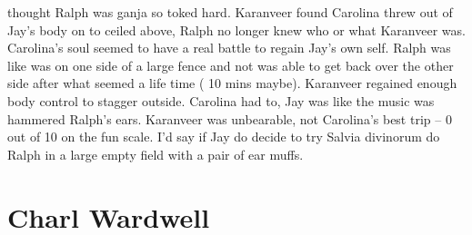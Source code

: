 \documentclass[12pt]{book}
\begin{document}
thought Ralph was ganja so toked hard. Karanveer found Carolina threw out of Jay's body on to ceiled above, Ralph no longer knew who or what Karanveer was. Carolina's soul seemed to have a real battle to regain Jay's own self. Ralph was like was on one side of a large fence and not was able to get back over the other side after what seemed a life time ( 10 mins maybe). Karanveer regained enough body control to stagger outside. Carolina had to, Jay was like the music was hammered Ralph's ears. Karanveer was unbearable, not Carolina's best trip -- 0 out of 10 on the fun scale. I'd say if Jay do decide to try Salvia divinorum do Ralph in a large empty field with a pair of ear muffs.



\chapter{Charl Wardwell}
\end{document}
